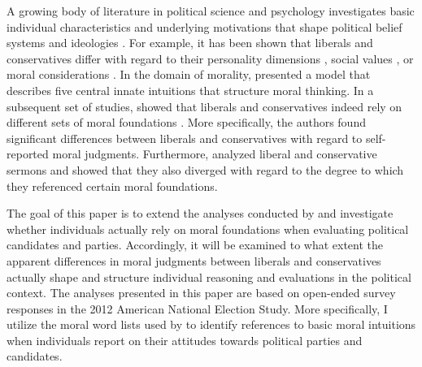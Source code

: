 \documentclass[12pt]{article}
\begin{document}
A growing body of literature in political science and psychology investigates basic individual characteristics and underlying motivations that shape political belief systems and ideologies \citep[c.f.][]{jost2003political,jost2006end,jost2009political}. For example, it has been shown that liberals and conservatives differ with regard to their personality dimensions \citep{gerber2010personality,hirsh2010compassionate,de2013personality}, social values \citep{schwartz2010basic,schwartz2011basic,piurko2011basic}, or moral considerations \citep{lakoff1995metaphor,haidt2008moral,mcadams2008family}. In the domain of morality, \citet{haidt2008moral} presented a model that describes five central innate intuitions that structure moral thinking. In a subsequent set of studies, \citet{graham2009liberals} showed that liberals and conservatives indeed rely on different sets of moral foundations \citep[see also][]{haidt2007morality}. More specifically, the authors found significant differences between liberals and conservatives with regard to self-reported moral judgments. Furthermore, \citet{graham2009liberals} analyzed liberal and conservative sermons and showed that they also diverged with regard to the degree to which they referenced certain moral foundations.

The goal of this paper is to extend the analyses conducted by \citet{graham2009liberals} and investigate whether individuals actually rely on moral foundations when evaluating political candidates and parties. Accordingly, it will be examined to what extent the apparent differences in moral judgments between liberals and conservatives actually shape and structure individual reasoning and evaluations in the political context. The analyses presented in this paper are based on open-ended survey responses in the 2012 American National Election Study. More specifically, I utilize the moral word lists used by \citet{graham2009liberals} to identify references to basic moral intuitions when individuals report on their attitudes towards political parties and candidates.
\end{document}
